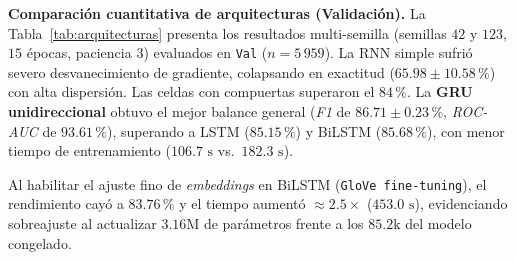 \documentclass[letterpaper, 10 pt, conference]{ieeeconf}
\begin{document}
\textbf{Comparación cuantitativa de arquitecturas (Validación).}
La Tabla~\ref{tab:arquitecturas} presenta los resultados multi-semilla (semillas $42$ y $123$, $15$ épocas, paciencia $3$) evaluados en \texttt{Val} ($n = 5\,959$). La RNN simple sufrió severo desvanecimiento de gradiente, colapsando en exactitud ($65.98 \pm 10.58\,\%$) con alta dispersión. Las celdas con compuertas superaron el $84\,\%$. La \textbf{GRU unidireccional} obtuvo el mejor balance general (\textit{F1} de $86.71 \pm 0.23\,\%$, \textit{ROC-AUC} de $93.61\,\%$), superando a LSTM ($85.15\,\%$) y BiLSTM ($85.68\,\%$), con menor tiempo de entrenamiento ($106.7\text{ s}$ vs.~$182.3\text{ s}$). 

Al habilitar el ajuste fino de \textit{embeddings} en BiLSTM (\texttt{GloVe fine-tuning}), el rendimiento cayó a $83.76\,\%$ y el tiempo aumentó $\approx 2.5\times$ ($453.0\text{ s}$), evidenciando sobreajuste al actualizar $3.16\text{M}$ de parámetros frente a los $85.2\text{k}$ del modelo congelado.

\begin{table}[t]
\centering
\caption{Comparación de arquitecturas en \texttt{Val} ($n = 5\,959$, $15$ épocas, $2$ semillas).}
\label{tab:arquitecturas}
\renewcommand{\arraystretch}{0.98}
\setlength{\tabcolsep}{2.8pt}
\end{table}
\end{document}
